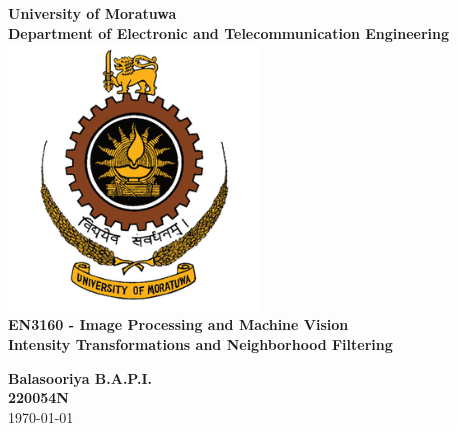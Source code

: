 \documentclass[11pt]{article}
\begin{document}

\begin{titlepage}
    \centering
    \vspace*{1cm}
    
    {\huge\textbf{University of Moratuwa}}\\[1cm]
    
    {\Large\textbf{Department of Electronic and Telecommunication Engineering}}\\[0.5cm]
    
    \includegraphics[width=0.5\textwidth]{resources/University_of_Moratuwa_logo.png}\\[1cm]
    
    {\large\textbf{EN3160 - Image Processing and Machine Vision}}\\[1cm]
    
    {\LARGE\textbf{Intensity Transformations and Neighborhood Filtering}}\\[1cm]


    \vspace{0.1cm}
    
    \begin{center}
        {\large\textbf{Balasooriya B.A.P.I.} \\
        \textbf{220054N} \\[0.5cm]
        \today}
    \end{center}
    
    \vfill
\end{titlepage}
\end{document}
